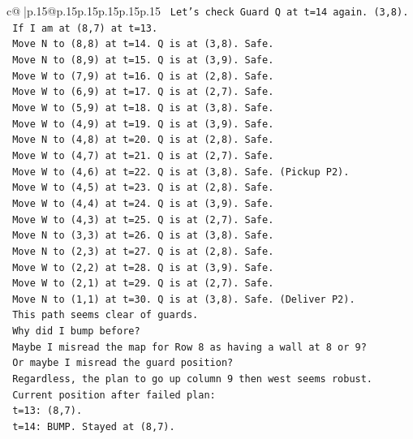 \documentclass{article}
\begin{document}
{\begin{supertabular}{c@{$\;$}|p{.15\linewidth}@{}p{.15\linewidth}p{.15\linewidth}p{.15\linewidth}p{.15\linewidth}p{.15\linewidth}}
{{{\texttt{   Let's check Guard Q at t=14 again. (3,8).} \\
\texttt{   If I am at (8,7) at t=13.} \\
\texttt{   Move N to (8,8) at t=14. Q is at (3,8). Safe.} \\
\texttt{   Move N to (8,9) at t=15. Q is at (3,9). Safe.} \\
\texttt{   Move W to (7,9) at t=16. Q is at (2,8). Safe.} \\
\texttt{   Move W to (6,9) at t=17. Q is at (2,7). Safe.} \\
\texttt{   Move W to (5,9) at t=18. Q is at (3,8). Safe.} \\
\texttt{   Move W to (4,9) at t=19. Q is at (3,9). Safe.} \\
\texttt{   Move N to (4,8) at t=20. Q is at (2,8). Safe.} \\
\texttt{   Move W to (4,7) at t=21. Q is at (2,7). Safe.} \\
\texttt{   Move W to (4,6) at t=22. Q is at (3,8). Safe. (Pickup P2).} \\
\texttt{   Move W to (4,5) at t=23. Q is at (2,8). Safe.} \\
\texttt{   Move W to (4,4) at t=24. Q is at (3,9). Safe.} \\
\texttt{   Move W to (4,3) at t=25. Q is at (2,7). Safe.} \\
\texttt{   Move N to (3,3) at t=26. Q is at (3,8). Safe.} \\
\texttt{   Move N to (2,3) at t=27. Q is at (2,8). Safe.} \\
\texttt{   Move W to (2,2) at t=28. Q is at (3,9). Safe.} \\
\texttt{   Move W to (2,1) at t=29. Q is at (2,7). Safe.} \\
\texttt{   Move N to (1,1) at t=30. Q is at (3,8). Safe. (Deliver P2).} \\
\texttt{   This path seems clear of guards.} \\
\texttt{   Why did I bump before?} \\
\texttt{   Maybe I misread the map for Row 8 as having a wall at 8 or 9?} \\
\texttt{   Or maybe I misread the guard position?} \\
\texttt{   Regardless, the plan to go up column 9 then west seems robust.} \\
\texttt{   Current position after failed plan:} \\
\texttt{   t=13: (8,7).} \\
\texttt{   t=14: BUMP. Stayed at (8,7).} \\
}}}
\end{supertabular}}
\end{document}
